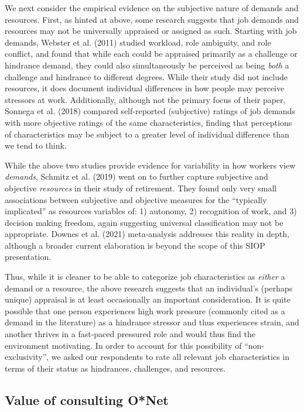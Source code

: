 \documentclass[
  man]{apa6}
\begin{document}
We next consider the empirical evidence on the subjective nature of demands and resources. First, as hinted at above, some research suggests that job demands and resources may not be universally appraised or assigned as such. Starting with job demands, Webster et al. (2011) studied workload, role ambiguity, and role conflict, and found that while each could be appraised primarily as a challenge or hindrance demand, they could also simultaneously be perceived as being \emph{both} a challenge and hindrance to different degrees. While their study did not include resources, it does document individual differences in how people may perceive stressors at work. Additionally, although not the primary focus of their paper, Sonnega et al. (2018) compared self-reported (subjective) ratings of job demands with more objective ratings of the same characteristics, finding that perceptions of characteristics may be subject to a greater level of individual difference than we tend to think.

While the above two studies provide evidence for variability in how workers view \emph{demands}, Schmitz et al. (2019) went on to further capture subjective and objective \emph{resources} in their study of retirement. They found only very small associations between subjective and objective measures for the ``typically implicated'' as resources variables of: 1) autonomy, 2) recognition of work, and 3) decision making freedom, again suggesting universal classification may not be appropriate. Downes et al. (2021) meta-analysis addresses this reality in depth, although a broader current elaboration is beyond the scope of this SIOP presentation.

Thus, while it is cleaner to be able to categorize job characteristics as \emph{either} a demand or a resource, the above research suggests that an individual's (perhaps unique) appraisal is at least occasionally an important consideration. It is quite possible that one person experiences high work pressure (commonly cited as a demand in the literature) as a hindrance stressor and thus experiences strain, and another thrives in a fast-paced pressured role and would thus find the environment motivating. In order to account for this possibility of ``non-exclusivity'', we asked our respondents to rate all relevant job characteristics in terms of their status as hindrances, challenges, and resources.

\hypertarget{value-of-consulting-onet}{%
\subsection{Value of consulting O*Net}\label{value-of-consulting-onet}}
\end{document}
